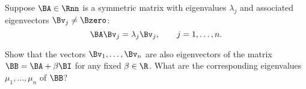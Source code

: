 Suppose $\BA\in\Rnn$ is a symmetric matrix with eigenvalues $\lambda_j$
and associated eigenvectors $\Bv_j\ne\Bzero$: 
\[ \BA\Bv_j = \lambda_j \Bv_j, \qquad j = 1, \ldots, n.\]

Show that the vectors $\Bv_1, \ldots, \Bv_n$ are also eigenvectors
of the matrix $\BB = \BA + \beta \BI$ for any fixed $\beta \in \R$.
What are the corresponding eigenvalues $\mu_1, \ldots, \mu_n$ of $\BB$?



